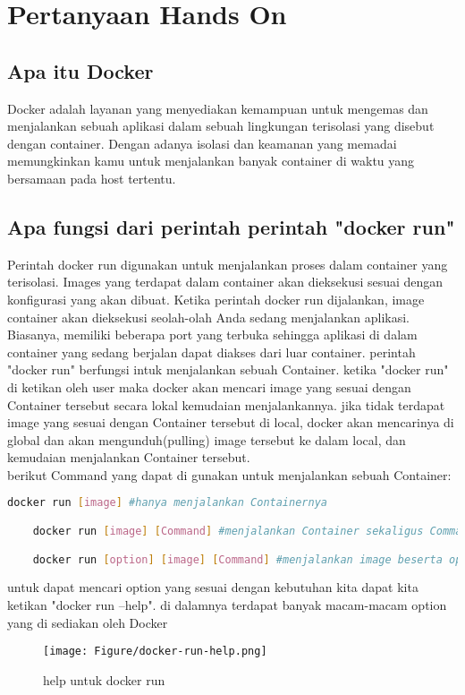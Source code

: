 \documentclass[11pt,a4paper]{article}
\begin{document}
\section{Pertanyaan Hands On}
\subsection{Apa itu Docker}
Docker adalah layanan yang menyediakan kemampuan untuk mengemas dan menjalankan sebuah aplikasi dalam sebuah lingkungan terisolasi yang disebut dengan container. Dengan adanya isolasi dan keamanan yang memadai memungkinkan kamu untuk menjalankan banyak container di waktu yang bersamaan pada host tertentu.


\subsection{Apa fungsi dari perintah perintah "docker run"}
Perintah docker run digunakan untuk menjalankan proses dalam container yang terisolasi. Images yang
terdapat dalam container akan dieksekusi sesuai dengan konfigurasi yang akan dibuat. Ketika perintah docker run dijalankan, image container akan dieksekusi seolah-olah Anda sedang menjalankan aplikasi. Biasanya,
memiliki beberapa port yang terbuka sehingga aplikasi di dalam container yang sedang berjalan dapat diakses
dari luar container.
perintah "docker run" berfungsi intuk menjalankan sebuah Container. ketika "docker run" di ketikan 
oleh user maka docker akan mencari image yang sesuai dengan Container tersebut
secara lokal kemudaian menjalankannya. jika tidak terdapat image yang sesuai dengan Container tersebut di local,
docker akan mencarinya di global dan akan mengunduh(pulling) image tersebut ke dalam local, dan kemudaian menjalankan
Container tersebut.\\
berikut Command yang dapat di gunakan untuk menjalankan sebuah Container:
\begin{lstlisting}[language = bash]
	docker run [image] #hanya menjalankan Containernya

	docker run [image] [Command] #menjalankan Container sekaligus Commandnya (contoh Command = echo)

	docker run [option] [image] [Command] #menjalankan image beserta option yang terdapat pada docker(Contoh option = -i)
\end{lstlisting}
untuk dapat mencari option yang sesuai dengan kebutuhan kita dapat kita ketikan "docker run --help".
di dalamnya terdapat banyak macam-macam option yang di sediakan oleh Docker
\begin{figure}[h]
	\centering
	\texttt{[image: Figure/docker-run-help.png]}
	\caption{help untuk docker run}
\end{figure}
\end{document}
